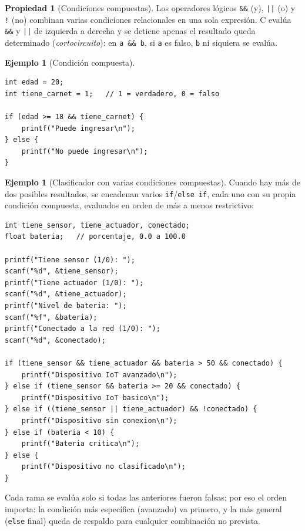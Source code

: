\documentclass[11pt,letterpaper]{article}
\theoremstyle{definition}
\newtheorem{ejemplo}[definicion]{Ejemplo}
\newtheorem{propiedad}[definicion]{Propiedad}
\begin{document}
\begin{propiedad}[Condiciones compuestas]
Los operadores lógicos \texttt{\&\&} (y), \texttt{||} (o) y \texttt{!} (no) combinan varias
condiciones relacionales en una sola expresión. C evalúa \texttt{\&\&} y \texttt{||} de izquierda a
derecha y se detiene apenas el resultado queda determinado (\emph{cortocircuito}): en
\texttt{a \&\& b}, si \texttt{a} es falso, \texttt{b} ni siquiera se evalúa.
\end{propiedad}

\begin{ejemplo}[Condición compuesta]
\begin{lstlisting}
int edad = 20;
int tiene_carnet = 1;   // 1 = verdadero, 0 = falso

if (edad >= 18 && tiene_carnet) {
    printf("Puede ingresar\n");
} else {
    printf("No puede ingresar\n");
}
\end{lstlisting}
\end{ejemplo}

\begin{ejemplo}[Clasificador con varias condiciones compuestas]
Cuando hay más de dos posibles resultados, se encadenan varios \texttt{if}/\texttt{else if}, cada
uno con su propia condición compuesta, evaluados en orden de más a menos restrictivo:
\begin{lstlisting}
int tiene_sensor, tiene_actuador, conectado;
float bateria;   // porcentaje, 0.0 a 100.0

printf("Tiene sensor (1/0): ");
scanf("%d", &tiene_sensor);
printf("Tiene actuador (1/0): ");
scanf("%d", &tiene_actuador);
printf("Nivel de bateria: ");
scanf("%f", &bateria);
printf("Conectado a la red (1/0): ");
scanf("%d", &conectado);

if (tiene_sensor && tiene_actuador && bateria > 50 && conectado) {
    printf("Dispositivo IoT avanzado\n");
} else if (tiene_sensor && bateria >= 20 && conectado) {
    printf("Dispositivo IoT basico\n");
} else if ((tiene_sensor || tiene_actuador) && !conectado) {
    printf("Dispositivo sin conexion\n");
} else if (bateria < 10) {
    printf("Bateria critica\n");
} else {
    printf("Dispositivo no clasificado\n");
}
\end{lstlisting}
Cada rama se evalúa solo si todas las anteriores fueron falsas; por eso el orden importa: la
condición más específica (avanzado) va primero, y la más general (\texttt{else} final) queda de
respaldo para cualquier combinación no prevista.
\end{ejemplo}
\end{document}
